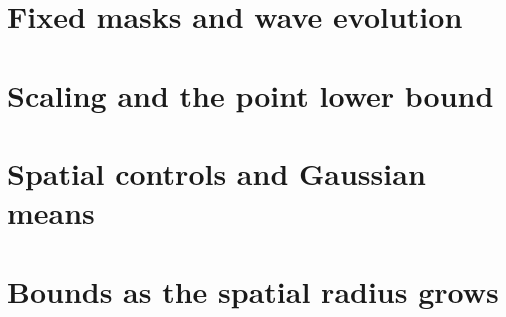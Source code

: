 \documentclass[12pt,oneside,openany]{book}
\numberwithin{equation}{section}
\theoremstyle{nogostyle}
\theoremstyle{definition}
\begin{document}







\chapter{Fixed masks and wave evolution}\label{S:book-wave-evolution}









\chapter{Scaling and the point lower bound}\label{S:book-lower}









\chapter{Spatial controls and Gaussian means}\label{S:book-means}












\chapter{Bounds as the spatial radius grows}\label{S:book-growing-radius}


\end{document}
